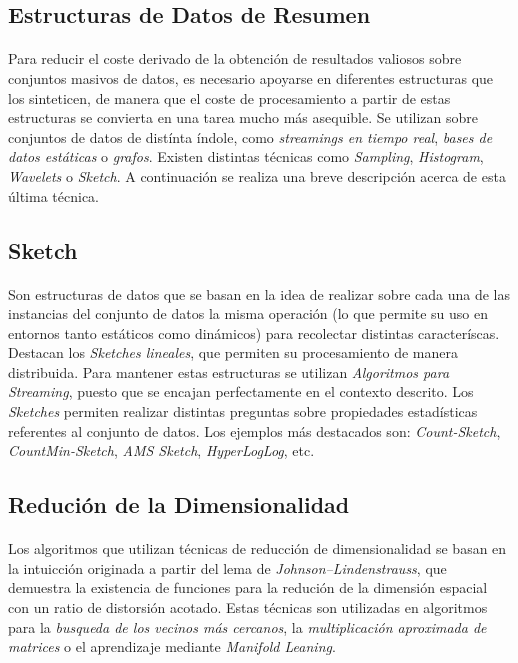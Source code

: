 \documentclass{subfiles}
\begin{document}
      \subsection{Estructuras de Datos de Resumen}

        \paragraph{}
        Para reducir el coste derivado de la obtención de resultados valiosos sobre conjuntos masivos de datos, es necesario apoyarse en diferentes estructuras que los sinteticen, de manera que el coste de procesamiento a partir de estas estructuras se convierta en una tarea mucho más asequible. Se utilizan sobre conjuntos de datos de distínta índole, como \emph{streamings en tiempo real}, \emph{bases de datos estáticas} o \emph{grafos}. Existen distintas técnicas como \emph{Sampling}, \emph{Histogram}, \emph{Wavelets} o \emph{Sketch}. A continuación se realiza una breve descripción acerca de esta última técnica.

        \subsection{Sketch}

          \paragraph{}
          Son estructuras de datos que se basan en la idea de realizar sobre cada una de las instancias del conjunto de datos la misma operación (lo que permite su uso en entornos tanto estáticos como dinámicos) para recolectar distintas caracteríscas. Destacan los \emph{Sketches lineales}, que permiten su procesamiento de manera distribuida. Para mantener estas estructuras se utilizan \emph{Algoritmos para Streaming}, puesto que se encajan perfectamente en el contexto descrito. Los \emph{Sketches} permiten realizar distintas preguntas sobre propiedades estadísticas referentes al conjunto de datos. Los ejemplos más destacados son: \emph{Count-Sketch}, \emph{CountMin-Sketch}, \emph{AMS Sketch}, \emph{HyperLogLog}, etc.

      \subsection{Redución de la Dimensionalidad}

        \paragraph{}
        Los algoritmos que utilizan técnicas de reducción de dimensionalidad se basan en la intuicción originada a partir del lema de \emph{Johnson–Lindenstrauss}, que demuestra la existencia de funciones para la redución de la dimensión espacial con un ratio de distorsión acotado. Estas técnicas son utilizadas en algoritmos para la \emph{busqueda de los vecinos más cercanos}, la \emph{multiplicación aproximada de matrices} o el aprendizaje mediante \emph{Manifold Leaning}.
\end{document}
